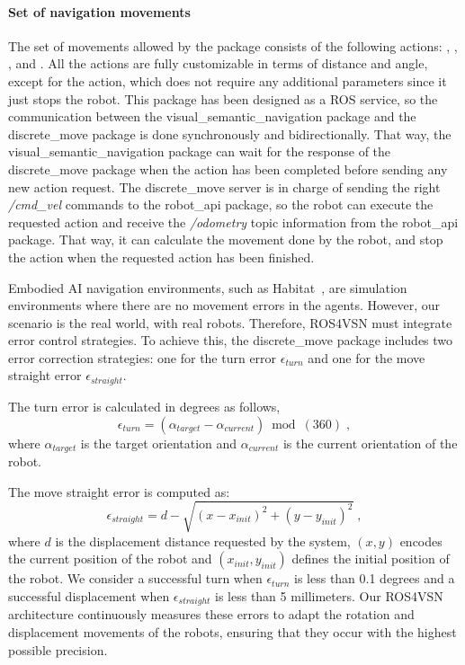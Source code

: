\paragraph{\textbf{Set of navigation movements}}\label{par:movement-set}

The set of movements allowed by the package consists of the following actions: \turnleft, \turnright, \moveforward, \movebackward and \stopac.
All the actions are fully customizable in terms of distance and angle, except for the \stopac action, which does not require any additional parameters since it just stops the robot.
This package has been designed as a ROS service, so the communication between the visual\_semantic\_navigation package and the discrete\_move package is done synchronously and bidirectionally.
That way, the visual\_semantic\_navigation package can wait for the response of the discrete\_move package when the action has been completed before sending any new action request.
The discrete\_move server is in charge of sending the right \textit{/cmd\_vel} commands to the robot\_api package, so the robot can execute the requested action and receive the \textit{/odometry} topic information from the robot\_api package.
That way, it can calculate the movement done by the robot, and stop the action when the requested action has been finished.

Embodied AI navigation environments, such as Habitat~\cite{NEURIPS2021_021bbc7e}, are simulation environments where there are no movement errors in the agents.
However, our scenario is the real world, with real robots.
Therefore, ROS4VSN must integrate error control strategies.
To achieve this, the discrete\_move package includes two error correction strategies: one for the turn error $\epsilon_{turn}$ and one for the move straight error $\epsilon_{straight}$.

The turn error is calculated in degrees as follows,
\begin{equation}
    \label{eq:turn_error}
    \epsilon_{turn} = (\alpha_{target}- \alpha_{current}) \bmod(360)\; ,
\end{equation}
where $\alpha_{target}$ is the target orientation and $\alpha_{current}$ is the current orientation of the robot.

The move straight error is computed as:
\begin{equation}
    \label{eq:error_move}
    \epsilon_{straight} = {d - \sqrt{(x-x_{init})^2+(y-y_{init})^2}}\; ,
\end{equation}
where $d$ is the displacement distance requested by the system, $(x,y)$ encodes the current position of the robot and $(x_{init},y_{init})$ defines the initial position of the robot.
We consider a successful turn when $\epsilon_{turn}$ is less than 0.1 degrees and a successful displacement when $\epsilon_{straight}$ is less than 5 millimeters.
Our ROS4VSN architecture continuously measures these errors to adapt the rotation and displacement movements of the robots, ensuring that they occur with the highest possible precision.


